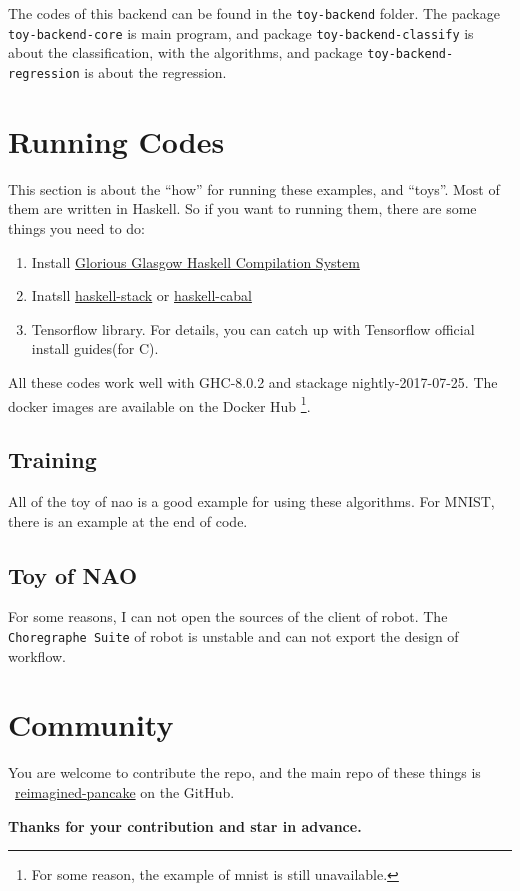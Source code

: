 \documentclass{article}
\begin{document}
\begin{appendix}
	The codes of this backend can be found in the \verb|toy-backend| folder.
	The package \verb|toy-backend-core| is main program, and package \verb|toy-backend-classify| is about the classification,
	with the algorithms, and package \verb|toy-backend-regression| is about the regression.
	
	\section{Running Codes}
	\label{apdx:run}
	
	This section is about the ``how'' for running these examples, and ``toys''.
	Most of them are written in Haskell. So if you want to running them, there are some things
	you need to do:
	\begin{enumerate}
		\item Install \href{https://www.haskell.org/ghc}{Glorious Glasgow Haskell Compilation System}
		\item Inatsll \href{https://www.haskellstack.org}{haskell-stack} or \href{https://www.haskell.org/cabal/}{haskell-cabal}
		\item Tensorflow library. For details, you can catch up with Tensorflow official install guides(for C).
	\end{enumerate}

	All these codes work well with GHC-8.0.2 and stackage nightly-2017-07-25.
	The docker images are available on the Docker Hub%
	\footnote{For some reason, the example of mnist is still unavailable.}.
	
	\subsection{Training}
	\label{run:tc}
	
	All of the toy of nao is a good example for using these algorithms.
	For MNIST, there is an example at the end of code.
	
	\subsection{Toy of NAO}
	\label{run:toy}
	
	For some reasons, I can not open the sources of the client of robot. The \verb|Choregraphe Suite| of robot is unstable and can not export the design of workflow.
	
	\section{Community}
	\label{aptx:commuity}
	
	You are welcome to contribute the repo, and the main repo of these things is
	\ \href{https://github.com/Qinka/reimagined-pancake}{reimagined-pancake} on the GitHub.
	
	\vspace*{1em}
	\begin{center}
	{\large \textbf{Thanks for your contribution and star in advance.}}
	\end{center}
	
	
\end{appendix}


\printbibliography
\tableofcontents
\end{document}
